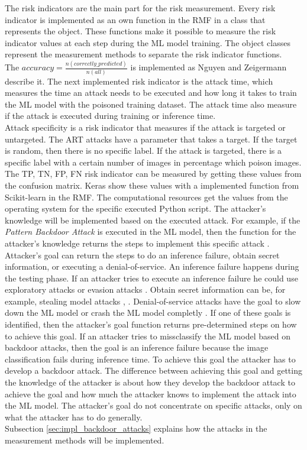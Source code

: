 The risk indicators are the main part for the risk measurement. Every risk indicator is implemented as an own function in the RMF in a class that represents the object. These functions make it possible to measure the risk indicator values at each step during the ML model training. The object classes represent the measurement methods to separate the risk indicator functions. \\
The $accuracy=\frac{n(correctly\_predicted)}{n(all)}$ is implemented as Nguyen and Zeigermann \cite{9783960101925} describe it. The next implemented risk indicator is the attack time, which measures the time an attack needs to be executed and how long it takes to train the ML model with the poisoned training dataset. The attack time also measure if the attack is executed during training or inference time. \\
Attack specificity is a risk indicator that measures if the attack is targeted or untargeted. The ART attacks have a parameter that takes a target. If the target is random, then there is no specific label. If the attack is targeted, there is a specific label with a certain number of images in percentage which poison images. The TP, TN, FP, FN risk indicator can be measured by getting these values from the confusion matrix. Keras show these values with a implemented function from Scikit-learn \cite{scikit-learn} in the RMF. The computational resources get the values from the operating system for the specific executed Python script. The attacker's knowledge will be implemented based on the executed attack. For example, if the \textit{Pattern Backdoor Attack} is executed in the ML model, then the function for the attacker's knowledge returns the steps to implement this specific attack \cite{bsi_2013}. Attacker's goal \cite{DBLP:journals/corr/abs-2012-04884} can return the steps to do an inference failure, obtain secret information, or executing a denial-of-service. An inference failure happens during the testing phase. If an attacker tries to execute an inference failure he could use exploratory attacks \cite{tabassi2019taxonomy} or evasion attacks \cite{DBLP:conf/sp/Carlini017}. Obtain secret information can be, for example, stealing model attacks \cite{DBLP:journals/corr/abs-2105-00623}, \cite{DBLP:journals/wicomm/ZhangLGQTZ20}. Denial-of-service attacks have the goal to slow down the ML model or crash the ML model completly \cite{DBLP:journals/sensors/VaccariAC20}. If one of these goals is identified, then the attacker's goal function returns pre-determined steps on how to achieve this goal. If an attacker tries to missclassify the ML model based on backdoor attacks, then the goal is an inference failure because the image classification fails during inference time. To achieve this goal the attacker has to develop a backdoor attack. The difference between achieving this goal and getting the knowledge of the attacker is about how they develop the backdoor attack to achieve the goal and how much the attacker knows to implement the attack into the ML model. The attacker's goal do not concentrate on specific attacks, only on what the attacker has to do generally. \\
Subsection \ref{sec:impl_backdoor_attacks} explains how the attacks in the measurement methods will be implemented.

